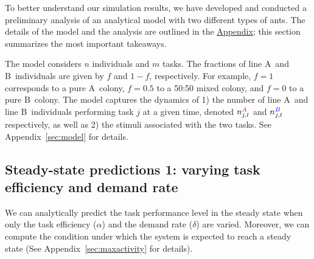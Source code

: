 \documentclass[11pt]{article}
\newcommand{\A}{{\color{red}A}}
\newcommand{\B}{{\color{blue}B}}
\begin{document}
To better understand our simulation results, we have developed and conducted a preliminary analysis of an analytical model with two different types of ants.  The details of the model and the analysis are outlined in the \hyperref[sec:appendix]{Appendix}; this section summarizes the most important takeaways.

The model considers $n$ individuals and $m$ tasks. The fractions of line \A\ and \B\ individuals are given by $f$ and $1-f$, respectively. For example, $f=1$ corresponds to a pure \A\ colony, $f = 0.5$ to a 50:50 mixed colony, and $f = 0$ to a pure \B\ colony. 
The model captures the dynamics of 1) the number of line \A\ and line \B\ individuals performing task $j$ at a given time, denoted $n_{j,t}^{\A}$ and $n_{j,t}^{\B}$ respectively, as well as 2) the stimuli associated with the two tasks. See Appendix~\ref{sec:model} for details.

\subsection{Steady-state predictions 1: varying task efficiency and demand rate} \label{sec:sspred1}
We can analytically predict the task performance level in the steady state when only the task efficiency ($\alpha$) and the demand rate ($\delta$) are varied. Moreover, we can compute the condition under which the system is expected to reach a steady state (See Appendix~\ref{sec:maxactivity} for details). 
\end{document}
